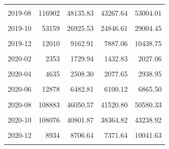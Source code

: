 \begin{longtable}[t]{crrrr}
\cellcolor{gray!10}{2019-07} & \cellcolor{gray!10}{23525} & \cellcolor{gray!10}{14895.89} & \cellcolor{gray!10}{12781.82} & \cellcolor{gray!10}{17009.97}\\
2019-08 & 116902 & 48135.83 & 43267.64 & 53004.01\\
\cellcolor{gray!10}{2019-09} & \cellcolor{gray!10}{130143} & \cellcolor{gray!10}{53007.55} & \cellcolor{gray!10}{50751.13} & \cellcolor{gray!10}{55263.97}\\
2019-10 & 53159 & 26925.53 & 24846.61 & 29004.45\\
\cellcolor{gray!10}{2019-11} & \cellcolor{gray!10}{34568} & \cellcolor{gray!10}{18989.31} & \cellcolor{gray!10}{17633.43} & \cellcolor{gray!10}{20345.18}\\
2019-12 & 12010 & 9162.91 & 7887.06 & 10438.75\\
\cellcolor{gray!10}{2020-01} & \cellcolor{gray!10}{5139} & \cellcolor{gray!10}{3202.70} & \cellcolor{gray!10}{2849.88} & \cellcolor{gray!10}{3555.52}\\
2020-02 & 2353 & 1729.94 & 1432.83 & 2027.06\\
\cellcolor{gray!10}{2020-03} & \cellcolor{gray!10}{7014} & \cellcolor{gray!10}{2967.49} & \cellcolor{gray!10}{2701.60} & \cellcolor{gray!10}{3233.37}\\
2020-04 & 4635 & 2508.30 & 2077.65 & 2938.95\\
\cellcolor{gray!10}{2020-05} & \cellcolor{gray!10}{5955} & \cellcolor{gray!10}{3296.37} & \cellcolor{gray!10}{2975.76} & \cellcolor{gray!10}{3616.98}\\
2020-06 & 12878 & 6482.81 & 6100.12 & 6865.50\\
\cellcolor{gray!10}{2020-07} & \cellcolor{gray!10}{27940} & \cellcolor{gray!10}{17001.26} & \cellcolor{gray!10}{13715.65} & \cellcolor{gray!10}{20286.86}\\
2020-08 & 108883 & 46050.57 & 41520.80 & 50580.33\\
\cellcolor{gray!10}{2020-09} & \cellcolor{gray!10}{202617} & \cellcolor{gray!10}{70470.56} & \cellcolor{gray!10}{67014.24} & \cellcolor{gray!10}{73926.87}\\
2020-10 & 108076 & 40801.87 & 38364.82 & 43238.92\\
\cellcolor{gray!10}{2020-11} & \cellcolor{gray!10}{20877} & \cellcolor{gray!10}{16156.21} & \cellcolor{gray!10}{14613.39} & \cellcolor{gray!10}{17699.03}\\
2020-12 & 8934 & 8706.64 & 7371.64 & 10041.63\\
\cellcolor{gray!10}{2021-01} & \cellcolor{gray!10}{3386} & \cellcolor{gray!10}{2875.04} & \cellcolor{gray!10}{2488.96} & \cellcolor{gray!10}{3261.12}\\

\end{longtable}
